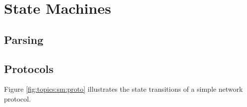 \section{State Machines}



\subsection{Parsing}

\subsection{Protocols}


Figure \ref{fig:topics:sm:proto} illustrates the state transitions of a simple network protocol.

